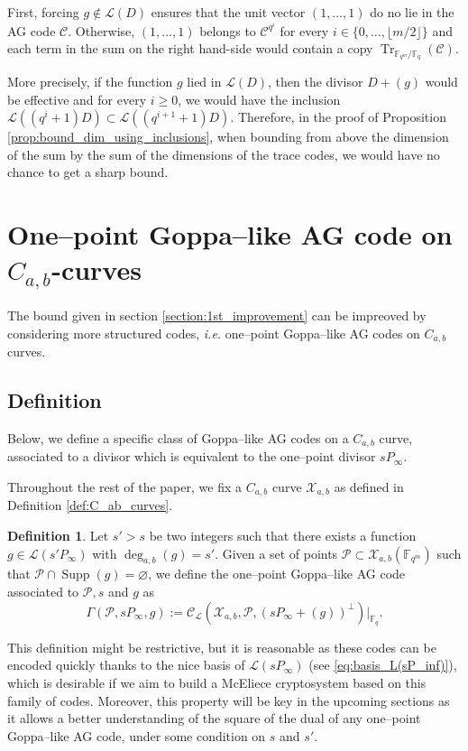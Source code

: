 \documentclass[a4paper]{article}
\theoremstyle{definition}
\newtheorem{definition}[thm]{Definition}
\theoremstyle{remark}
\newcommand{\calP}{\mathcal{P}}
\newcommand{\calL}{\mathcal{L}}
\newcommand{\calC}{\mathcal{C}}
\newcommand{\calX}{\mathcal{X}}
\newcommand{\fq}{\mathbb{F}_{q}}
\newcommand{\F}{\mathbb{F}}
\newcommand{\Tr}[1]{\operatorname{Tr}_{\mathbb{F}_{q^m}/\fq}\left(#1\right)}
\newcommand{\Supp}{\operatorname{Supp}}
\newcommand{\degab}[1]{\deg_{a,b}\left(#1\right)}
\begin{document}
First, forcing $g \notin \calL(D)$ ensures that the unit vector $(1,\dots,1)$ do no lie in the AG code $\calC$. Otherwise, $(1,\dots,1)$ belongs to $\calC^{q^i}$ for every $i \in \{0,\dots, \lfloor{m/2} \rfloor\}$ and each term in the sum on the right hand-side would contain a copy $\Tr{\calC}$.

More precisely, if the function $g$ lied in $\calL(D)$, then the divisor $D+(g)$ would be effective and for every $i \geq 0$, we would have the inclusion $\calL((q^i+1)D) \subset \calL((q^{i+1}+1)D)$. Therefore, in the proof of Proposition \ref{prop:bound_dim_using_inclusions}, when bounding from above the dimension of the sum by the sum of the dimensions of the trace codes, we would have no chance to get a sharp bound.

\section{One--point Goppa--like AG code on $C_{a,b}$-curves}

The bound given in section \ref{section:1st_improvement} can be impreoved by considering more structured codes, \emph{i.e.} one--point Goppa--like AG codes on $C_{a,b}$ curves.

\subsection{Definition}


Below, we define a specific class of Goppa--like AG codes on a $C_{a,b}$ curve, associated to a divisor which is equivalent to the one--point divisor $sP_\infty$. 

\noindent Throughout the rest of the paper, we fix a $C_{a,b}$ curve $\calX_{a,b}$ as defined in Definition \ref{def:C_ab_curves}.

\begin{definition} \label{def:one--point_Goppa--like_AG_codes_on_C_a,b_curves}
Let $s'>s$ be two integers such that there exists a function $g \in \calL(s'P_\infty)$ with $\degab{g}=s'$. Given a set of points  $\calP \subset \calX_{a,b}(\F_{q^m})$ such that $\calP \cap \Supp(g) = \varnothing$, we define the one--point Goppa--like AG code associated to $\calP,s$ and $g$ as 
\[\Gamma(\calP,sP_\infty,g) := \calC_{\calL}(\calX_{a,b},\calP,(sP_\infty+(g))^{\perp})|_{\fq}.\]
\end{definition}

This definition might be restrictive, but it is reasonable as these codes can be encoded quickly thanks to the nice basis of $\calL(sP_\infty)$ (see \eqref{eq:basis_L(sP_inf)}), which is desirable if we aim to build a McEliece cryptosystem based on this family of codes. Moreover, this property will be key in the upcoming sections as it allows a better understanding of the square of the dual of any one--point Goppa--like AG code, under some condition on $s$ and $s'$. \\
\end{document}
